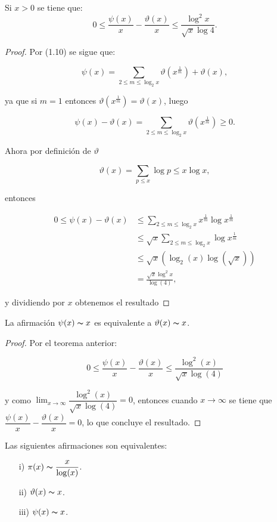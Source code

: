 \begin{theorem}
    Si $x>0$ se tiene que:
$$
0 \leq \frac{\psi(x)}{x}-\frac{\vartheta(x)}{x} \leq \frac{\log ^2 x}{\sqrt{x} \log 4} .
$$
\end{theorem}


\begin{proof}

Por (1.10) se sigue que:

    $$
\psi(x)=\sum_{2 \leq m \leq \log _2 x} \vartheta\left(x^{\frac{1}{m}}\right)+\vartheta(x) ,
$$

ya que si $m=1$ entonces $\vartheta(x^{\frac{1}{m}})=\vartheta(x)$, luego

$$
\psi(x)-\vartheta(x)=\sum_{2 \leq m \leq \log _2 x} \vartheta\left(x^{\frac{1}{m}}\right)\geq  0.
$$

Ahora por definición de $\vartheta$

$$
\vartheta(x)=\sum_{p \leq x} \log p\leq x \log x ,
$$

entonces

\begin{align*}
    0 \leq \psi(x)-\vartheta(x) &\leq \sum_{2 \leq m \leq \log _2 x} x^{\frac{1}{m}} \log x^{\frac{1}{m}} \\
    &\leq \sqrt{x} \sum_{2 \leq m \leq \log _2 x} \log x^{\frac{1}{m}}\\
    &\leq \sqrt{x}(\log_2(x)\log(\sqrt{x}))\\
    &=\frac{\sqrt{x}\log^2 x}{\log(4)},
\end{align*}

y dividiendo por $x$ obtenemos el resultado
\end{proof}

\begin{theorem}
    La afirmación $\psi(x)\thicksim x$ es equivalente a $\vartheta(x)\thicksim x$.
\end{theorem}

\begin{proof}
    Por el teorema anterior:

    $$0\leq \dfrac{\psi(x)}{x}-\dfrac{\vartheta(x)}{x}\leq \dfrac{\log^2(x)}{\sqrt{x}\log(4)}$$

    y como $\lim_{x\to \infty} \dfrac{\log^2(x)}{\sqrt{x}\log(4)}=0$, entonces cuando $x\to \infty$ se tiene que $\dfrac{\psi(x)}{x}-\dfrac{\vartheta(x)}{x}=0$, lo que concluye el resultado.
\end{proof}


\begin{theorem}
\label{equivalencia tnp}
    Las siguientes afirmaciones son equivalentes:
    \begin{itemize}
        \item[i)] $\pi(x)\thicksim \dfrac{x}{\log(x)}$.

        \item [ii)] $\vartheta(x)\thicksim x$.

        \item[iii)] $\psi(x)\thicksim x$.
    \end{itemize}    
\end{theorem}

